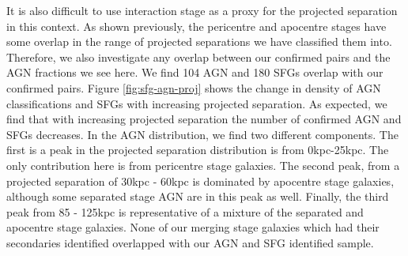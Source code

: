 It is also difficult to use interaction stage as a proxy for the projected separation in this context. As shown previously, the pericentre and apocentre stages have some overlap in the range of projected separations we have classified them into. Therefore, we also investigate any overlap between our confirmed pairs and the AGN fractions we see here. We find 104 AGN and 180 SFGs overlap with our confirmed pairs. Figure \ref{fig:sfg-agn-proj} shows the change in density of AGN classifications and SFGs with increasing projected separation. As expected, we find that with increasing projected separation the number of confirmed AGN and SFGs decreases. In the AGN distribution, we find two different components. The first is a peak in the projected separation distribution is from 0kpc-25kpc. The only contribution here is from pericentre stage galaxies. The second peak, from a projected separation of 30kpc - 60kpc is dominated by apocentre stage galaxies, although some separated stage AGN are in this peak as well. Finally, the third peak from 85 - 125kpc is representative of a mixture of the separated and apocentre stage galaxies. None of our merging stage galaxies which had their secondaries identified overlapped with our AGN and SFG identified sample.


